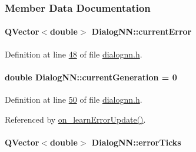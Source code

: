 \subsubsection{Member Data Documentation}
\hypertarget{class_dialog_n_n_a4ef13ab4b2de7e544686065a41ef1b74}{}
\paragraph[{current\+Error}]{\setlength{\rightskip}{0pt plus 5cm}Q\+Vector$<$double$>$ Dialog\+N\+N\+::current\+Error\hspace{0.3cm}{\ttfamily [private]}}\label{class_dialog_n_n_a4ef13ab4b2de7e544686065a41ef1b74}


Definition at line \hyperlink{dialognn_8h_source_l00048}{48} of file \hyperlink{dialognn_8h_source}{dialognn.\+h}.

\hypertarget{class_dialog_n_n_a886cc6b16f26f822a3a39ed7812f26a5}{}
\paragraph[{current\+Generation}]{\setlength{\rightskip}{0pt plus 5cm}double Dialog\+N\+N\+::current\+Generation = 0\hspace{0.3cm}{\ttfamily [private]}}\label{class_dialog_n_n_a886cc6b16f26f822a3a39ed7812f26a5}


Definition at line \hyperlink{dialognn_8h_source_l00050}{50} of file \hyperlink{dialognn_8h_source}{dialognn.\+h}.



Referenced by \hyperlink{dialognn_8cpp_source_l00050}{on\+\_\+learn\+Error\+Update()}.

\hypertarget{class_dialog_n_n_af0eb5fbc415d948bedf5120bdd256e1c}{}
\paragraph[{error\+Ticks}]{\setlength{\rightskip}{0pt plus 5cm}Q\+Vector$<$double$>$ Dialog\+N\+N\+::error\+Ticks\hspace{0.3cm}{\ttfamily [private]}}\label{class_dialog_n_n_af0eb5fbc415d948bedf5120bdd256e1c}


